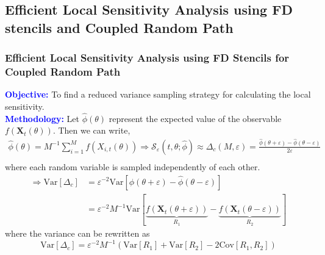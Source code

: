 \documentclass[a4paper,10pt]{beamer}
\newcommand{\BS}[1]{\boldsymbol{#1}}
\newcommand{\sqb}[1]{\left[ #1 \right]}
\newcommand{\rb}[1]{\left( #1 \right)}
\begin{document}
	\begin{frame}
		\subsection{Efficient Local Sensitivity Analysis using FD stencils and Coupled Random Path}
		\frametitle{\large Efficient Local Sensitivity Analysis using FD Stencils for Coupled Random Path}
		\footnotesize
		\textcolor{blue}{\textbf{Objective:}} To find a reduced variance sampling strategy for calculating the local sensitivity.\\
		\vspace{0.15cm}
		\textcolor{blue}{\textbf{Methodology:}}
		Let $\hat{\phi}\rb{\theta}$ represent the expected value of the observable $f\rb{\BS{X}_{t}\rb{\theta}}$. Then we can write,
		\footnotesize
		\begin{align*}
			\hat{\phi}\rb{\theta} = M^{-1} \sum_{i=1}^{M} f\rb{X_{i,t}\rb{\theta}} \Rightarrow \mathcal{S}_{\varepsilon} \rb{t,\theta;\hat{\phi}} \approx \Delta_{c} \rb{M,\varepsilon} = \frac{\hat{\phi}\rb{\theta + \varepsilon}-\hat{\phi}\rb{\theta-\varepsilon}}{2\varepsilon} \\
		\end{align*}
		where each random variable is sampled independently of each other.
		\footnotesize
		\begin{align*}
			\Rightarrow \text{Var}\sqb{\Delta_{c}} &= \varepsilon^{-2} \text{Var} \sqb{\hat{\phi} \rb{\theta + \varepsilon} - \hat{\phi} \rb{\theta - \varepsilon}} \\ &= \varepsilon^{-2} M^{-1} \text{Var} \sqb{\underbrace{f\rb{\BS{X}_{t}\rb{\theta + \varepsilon}}}_{R_{1}} - \underbrace{f\rb{\BS{X}_{t}\rb{\theta - \varepsilon}}}_{R_{2}}}
		\end{align*}
		where the variance can be rewritten as
		\footnotesize
		$$ \text{Var}\sqb{\Delta_{c}} = \varepsilon^{-2} M^{-1} \rb{\text{Var}\sqb{R_{1}} + \text{Var}\sqb{R_{2}} - 2 \text{Cov} \sqb{R_{1},R_{2}}} $$ 
	\end{frame}
	
\end{document}
